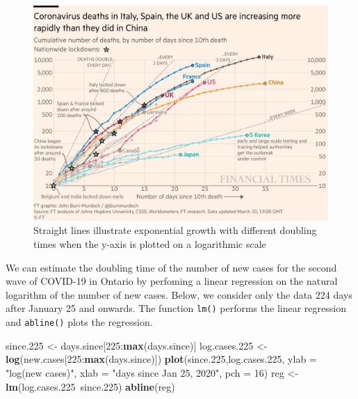 \documentclass[]{book}
\newenvironment{Shaded}{\begin{snugshade}}{\end{snugshade}}
\newcommand{\KeywordTok}[1]{\textcolor[rgb]{0.13,0.29,0.53}{\textbf{{#1}}}}
\newcommand{\DataTypeTok}[1]{\textcolor[rgb]{0.13,0.29,0.53}{{#1}}}
\newcommand{\DecValTok}[1]{\textcolor[rgb]{0.00,0.00,0.81}{{#1}}}
\newcommand{\FloatTok}[1]{\textcolor[rgb]{0.00,0.00,0.81}{{#1}}}
\newcommand{\StringTok}[1]{\textcolor[rgb]{0.31,0.60,0.02}{{#1}}}
\newcommand{\NormalTok}[1]{{#1}}
\begin{document}
\begin{figure}
\includegraphics[width=0.95\linewidth]{figures/doublingtime} \caption{Straight lines illustrate exponential growth with different doubling times when the y-axis is plotted on a logarithmic scale}\label{fig:doublingtime2}
\end{figure}

We can estimate the doubling time of the number of new cases for the
second wave of COVID-19 in Ontario by perfoming a linear regression on
the natural logarithm of the number of new cases. Below, we consider
only the data 224 days after January 25 and onwards. The function
\texttt{lm()} performs the linear regression and \texttt{abline()} plots
the regression.

\begin{Shaded}
\begin{Highlighting}[]
\NormalTok{since}\FloatTok{.225} \NormalTok{<-}\StringTok{ }\NormalTok{days.since[}\DecValTok{225}\NormalTok{:}\KeywordTok{max}\NormalTok{(days.since)]}
\NormalTok{log.cases}\FloatTok{.225} \NormalTok{<-}\StringTok{ }\KeywordTok{log}\NormalTok{(new.cases[}\DecValTok{225}\NormalTok{:}\KeywordTok{max}\NormalTok{(days.since)])}
\KeywordTok{plot}\NormalTok{(since}\FloatTok{.225}\NormalTok{,log.cases}\FloatTok{.225}\NormalTok{, }\DataTypeTok{ylab =} \StringTok{"log(new cases)"}\NormalTok{, }\DataTypeTok{xlab =} \StringTok{"days since Jan 25, 2020"}\NormalTok{, }\DataTypeTok{pch =} \DecValTok{16}\NormalTok{)}
\NormalTok{reg <-}\StringTok{ }\KeywordTok{lm}\NormalTok{(log.cases}\FloatTok{.225}\NormalTok{~since}\FloatTok{.225}\NormalTok{)}
\KeywordTok{abline}\NormalTok{(reg)}
\end{Highlighting}
\end{Shaded}
\end{document}
